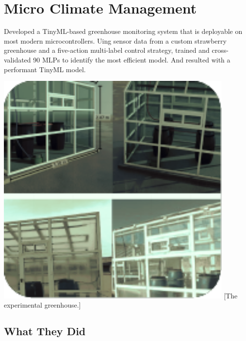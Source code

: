 \documentclass[../../main]{subfiles}
\begin{document}
\section{Micro Climate Management} \label{sec:}

\begin{minipage} {0.62\textwidth}
    \vspace{-0.8cm}

    Developed a TinyML-based greenhouse monitoring system that is deployable on
    most modern microcontrollers. Uing sensor data from a custom strawberry greenhouse
    and a five-action multi-label control strategy, trained and cross-validated 90
    MLPs to identify the most efficient model. And resulted with a performant
    TinyML model.

\end{minipage}
\hfill
\begin{minipage} {0.35\textwidth}
    \begin{center}
        \vspace{-1.2cm}
        \includegraphics[width = 0.89\textwidth] {pics/microclimate.pdf}
        [The experimental greenhouse.]{}
        \label{fig:case2Pic}
    \end{center}
\end{minipage}

\subsection{What They Did}
\end{document}

